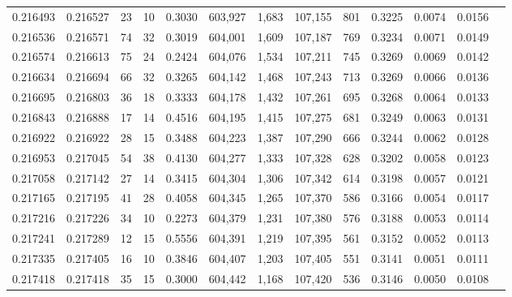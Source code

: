\begin{tabular}{rrrrrrrrrrrrr}
0.216493 & 0.216527 &    23 &  10 &                                     0.3030 & 603,927 &   1,683 & 107,155 &     801 & 0.3225 & 0.0074 & 0.0156 \\
0.216536 & 0.216571 &    74 &  32 &                                     0.3019 & 604,001 &   1,609 & 107,187 &     769 & 0.3234 & 0.0071 & 0.0149 \\
0.216574 & 0.216613 &    75 &  24 &                                     0.2424 & 604,076 &   1,534 & 107,211 &     745 & 0.3269 & 0.0069 & 0.0142 \\
0.216634 & 0.216694 &    66 &  32 &                                     0.3265 & 604,142 &   1,468 & 107,243 &     713 & 0.3269 & 0.0066 & 0.0136 \\
0.216695 & 0.216803 &    36 &  18 &                                     0.3333 & 604,178 &   1,432 & 107,261 &     695 & 0.3268 & 0.0064 & 0.0133 \\
0.216843 & 0.216888 &    17 &  14 &                                     0.4516 & 604,195 &   1,415 & 107,275 &     681 & 0.3249 & 0.0063 & 0.0131 \\
0.216922 & 0.216922 &    28 &  15 &                                     0.3488 & 604,223 &   1,387 & 107,290 &     666 & 0.3244 & 0.0062 & 0.0128 \\
0.216953 & 0.217045 &    54 &  38 &                                     0.4130 & 604,277 &   1,333 & 107,328 &     628 & 0.3202 & 0.0058 & 0.0123 \\
0.217058 & 0.217142 &    27 &  14 &                                     0.3415 & 604,304 &   1,306 & 107,342 &     614 & 0.3198 & 0.0057 & 0.0121 \\
0.217165 & 0.217195 &    41 &  28 &                                     0.4058 & 604,345 &   1,265 & 107,370 &     586 & 0.3166 & 0.0054 & 0.0117 \\
0.217216 & 0.217226 &    34 &  10 &                                     0.2273 & 604,379 &   1,231 & 107,380 &     576 & 0.3188 & 0.0053 & 0.0114 \\
0.217241 & 0.217289 &    12 &  15 &                                     0.5556 & 604,391 &   1,219 & 107,395 &     561 & 0.3152 & 0.0052 & 0.0113 \\
0.217335 & 0.217405 &    16 &  10 &                                     0.3846 & 604,407 &   1,203 & 107,405 &     551 & 0.3141 & 0.0051 & 0.0111 \\
0.217418 & 0.217418 &    35 &  15 &                                     0.3000 & 604,442 &   1,168 & 107,420 &     536 & 0.3146 & 0.0050 & 0.0108 \\

\end{tabular}
